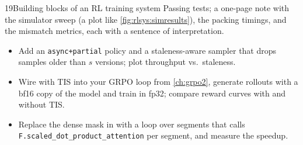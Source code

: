 \begin{labbox}{19}{Building blocks of an RL training system}
Passing tests; a one-page note with the simulator sweep (a plot like
\cref{fig:rlsys:simresults}), the packing timings, and the mismatch metrics, each with a
sentence of interpretation.

\begin{itemize}
\item Add an \texttt{async+partial} policy and a staleness-aware sampler that drops samples
older than $s$ versions; plot throughput vs.\ staleness.
\item Wire  with TIS into your GRPO loop from \cref{ch:grpo2}, generate
rollouts with a bf16 copy of the model and train in fp32; compare reward curves with and without
TIS.
\item Replace the dense mask in  with a loop over segments that calls
\texttt{F.scaled\_dot\_product\_attention} per segment, and measure the speedup.
\end{itemize}
\end{labbox}
